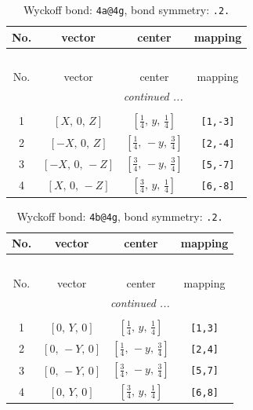 \documentclass[fleqn,8pt]{jsarticle}
\begin{document}
\begin{longtable}{cccc}
\caption{Wyckoff bond: {\tt 4a@4g}, bond symmetry: {\tt .2.}}
 \\
 \hline \hline
No. & vector & center & mapping \\ \hline \endfirsthead

\multicolumn{3}{l}{\tablename\ \thetable{}} \\
 \hline \hline
No. & vector & center & mapping \\ \hline \endhead

 \hline \hline
\multicolumn{3}{r}{\footnotesize\it continued ...} \\ \endfoot

 \hline \hline
\multicolumn{3}{r}{} \\ \endlastfoot

1 & $\left[ X,\, 0,\, Z \right]$ & $\left[ \frac{1}{4},\, y,\, \frac{1}{4} \right]$ & {\tt [1,-3]} \\ \hline
2 & $\left[ - X,\, 0,\, Z \right]$ & $\left[ \frac{1}{4},\, - y,\, \frac{3}{4} \right]$ & {\tt [2,-4]} \\ \hline
3 & $\left[ - X,\, 0,\, - Z \right]$ & $\left[ \frac{3}{4},\, - y,\, \frac{3}{4} \right]$ & {\tt [5,-7]} \\ \hline
4 & $\left[ X,\, 0,\, - Z \right]$ & $\left[ \frac{3}{4},\, y,\, \frac{1}{4} \right]$ & {\tt [6,-8]} \\
\end{longtable}
\renewcommand{\arraystretch}{1.2}
\begin{longtable}{cccc}
\caption{Wyckoff bond: {\tt 4b@4g}, bond symmetry: {\tt .2.}}
 \\
 \hline \hline
No. & vector & center & mapping \\ \hline \endfirsthead

\multicolumn{3}{l}{\tablename\ \thetable{}} \\
 \hline \hline
No. & vector & center & mapping \\ \hline \endhead

 \hline \hline
\multicolumn{3}{r}{\footnotesize\it continued ...} \\ \endfoot

 \hline \hline
\multicolumn{3}{r}{} \\ \endlastfoot

1 & $\left[ 0,\, Y,\, 0 \right]$ & $\left[ \frac{1}{4},\, y,\, \frac{1}{4} \right]$ & {\tt [1,3]} \\ \hline
2 & $\left[ 0,\, - Y,\, 0 \right]$ & $\left[ \frac{1}{4},\, - y,\, \frac{3}{4} \right]$ & {\tt [2,4]} \\ \hline
3 & $\left[ 0,\, - Y,\, 0 \right]$ & $\left[ \frac{3}{4},\, - y,\, \frac{3}{4} \right]$ & {\tt [5,7]} \\ \hline
4 & $\left[ 0,\, Y,\, 0 \right]$ & $\left[ \frac{3}{4},\, y,\, \frac{1}{4} \right]$ & {\tt [6,8]} \\
\end{longtable}
\end{document}
